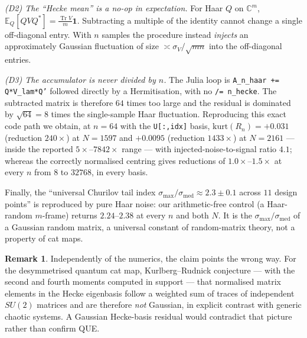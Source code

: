 \documentclass[11pt,reqno]{amsart}
\theoremstyle{definition}
\newtheorem{remark}[theorem]{Remark}
\DeclareMathOperator{\Tr}{Tr}
\newcommand{\CC}{\mathbb{C}}
\begin{document}
\emph{(D2) The ``Hecke mean'' is a no-op in expectation.} For Haar $Q$ on
$\CC^m$, $\mathbb E_Q[QV Q^*]=\frac{\Tr V}{m}\mathbf 1$. Subtracting a multiple
of the identity cannot change a single off-diagonal entry. With $n$ samples the
procedure instead \emph{injects} an approximately Gaussian fluctuation of size
$\asymp\sigma_V/\sqrt{mn}$ into the off-diagonal entries.

\emph{(D3) The accumulator is never divided by $n$.} The Julia loop is
\texttt{A\_n\_haar += Q*V\_lam*Q'} followed directly by a Hermitisation, with no
\texttt{/= n\_hecke}. The subtracted matrix is therefore $64$ times too large and
the residual is dominated by $\sqrt{64}=8$ times the single-sample Haar
fluctuation. Reproducing this exact code path we obtain, at $n=64$ with the
\texttt{U[:,idx]} basis, $\mathrm{kurt}(R_n)=+0.031$ (reduction $240\times$) at
$N=1597$ and $+0.0095$ (reduction $1433\times$) at $N=2161$ --- inside the
reported $5\times$--$7842\times$ range --- with injected-noise-to-signal ratio
$4.1$; whereas the correctly normalised centring gives reductions of
$1.0\times$--$1.5\times$ at every $n$ from $8$ to $32768$, in every basis.

Finally, the ``universal Churilov tail index $\sigma_{\max}/\sigma_{\mathrm{med}}
\approx2.3\pm0.1$ across $11$ design points'' is reproduced by pure Haar noise:
our arithmetic-free control (a Haar-random $m$-frame) returns
$2.24$--$2.38$ at every $n$ and both $N$. It is the $\sigma_{\max}/
\sigma_{\mathrm{med}}$ of a Gaussian random matrix, a universal constant of
random-matrix theory, not a property of cat maps.

\begin{remark}
Independently of the numerics, the claim points the wrong way. For the
desymmetrised quantum cat map, Kurlberg--Rudnick \cite{KurlbergRudnick2005}
conjecture --- with the second and fourth moments computed in support --- that
normalised matrix elements in the Hecke eigenbasis follow a weighted sum of
traces of independent $SU(2)$ matrices and are therefore \emph{not} Gaussian, in
explicit contrast with generic chaotic systems. A Gaussian Hecke-basis residual
would contradict that picture rather than confirm QUE.
\end{remark}
\end{document}

